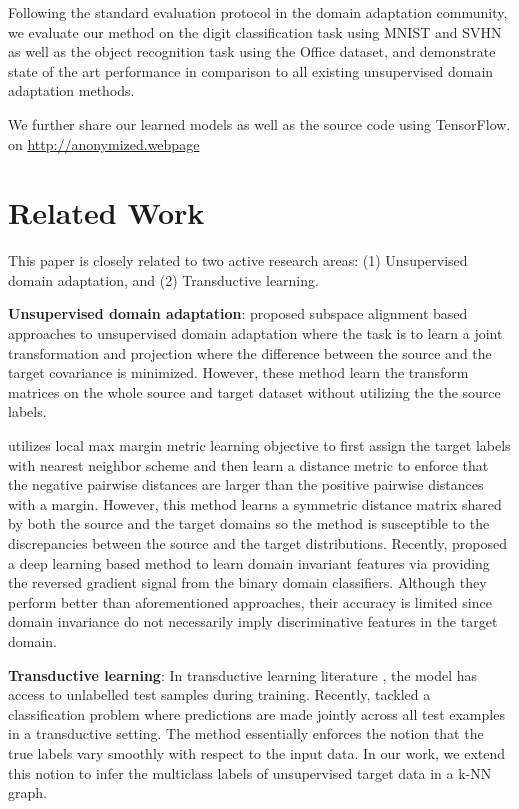 \documentclass{article}
\begin{document}
Following the standard evaluation protocol in the domain adaptation community, we evaluate our method on the digit classification task using MNIST \cite{mnist} and SVHN\cite{svhn} as well as the object recognition task using the Office \cite{office} dataset, and demonstrate state of the art performance in comparison to all existing unsupervised domain adaptation methods. 

We further share our learned models as well as the source code using TensorFlow\cite{tensorflow}. on \url{http://anonymized.webpage}

\section{Related Work} 

This paper is closely related to two active research areas: (1) Unsupervised domain adaptation, and (2) Transductive learning.

\textbf{Unsupervised domain adaptation}: \cite{gong12, baochen15, fernando13, baochen16} proposed subspace alignment based approaches to unsupervised domain adaptation where the task is to learn a joint transformation and projection where the difference between the source and the target covariance is minimized. However, these method learn the transform matrices on the whole source and target dataset without utilizing the the source labels. 

\cite{tommasi13} utilizes local max margin metric learning objective \cite{lmnn} to first assign the target labels with nearest neighbor scheme and then learn a distance metric to enforce that the negative pairwise distances are larger than the positive pairwise distances with a margin. However, this method learns a symmetric distance matrix shared by both the source and the target domains so the method is susceptible to the discrepancies between the source and the target distributions. Recently, \cite{ganin15, tzeng14} proposed a deep learning based method to learn domain invariant features via providing the reversed gradient signal from the binary domain classifiers. Although they perform better than aforementioned approaches, their accuracy is limited since domain invariance do not necessarily imply discriminative features in the target domain. 

\textbf{Transductive learning}: In transductive learning literature \cite{transduction}, the model has access to unlabelled test samples during training. Recently, \cite{coclassification} tackled a classification problem where predictions are made jointly across all test examples in a transductive \cite{transduction} setting. The method essentially enforces the notion that the true labels vary smoothly with respect to the input data. In our work, we extend this notion to infer the multiclass labels of unsupervised target data in a k-NN graph. 
\end{document}
